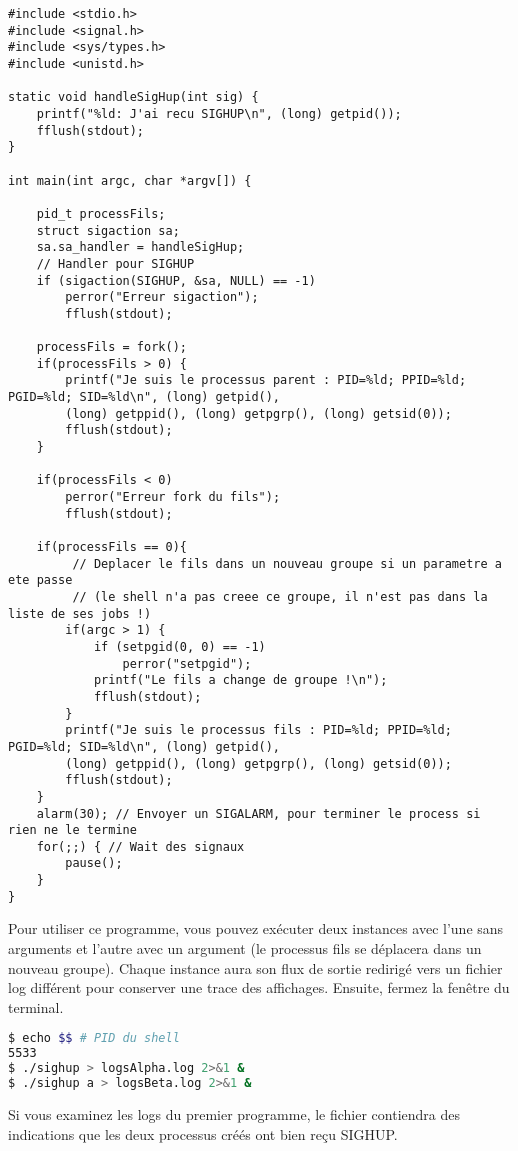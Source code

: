 \begin{lstlisting}[caption={sighup.c}, label={sighup.c}]
#include <stdio.h>
#include <signal.h>
#include <sys/types.h>
#include <unistd.h>

static void handleSigHup(int sig) {
    printf("%ld: J'ai recu SIGHUP\n", (long) getpid());
    fflush(stdout);
}

int main(int argc, char *argv[]) {

    pid_t processFils;
    struct sigaction sa;
    sa.sa_handler = handleSigHup;
    // Handler pour SIGHUP
    if (sigaction(SIGHUP, &sa, NULL) == -1)
        perror("Erreur sigaction");
        fflush(stdout);

    processFils = fork();
    if(processFils > 0) {
        printf("Je suis le processus parent : PID=%ld; PPID=%ld; PGID=%ld; SID=%ld\n", (long) getpid(),
        (long) getppid(), (long) getpgrp(), (long) getsid(0));
        fflush(stdout);
    }

    if(processFils < 0)
        perror("Erreur fork du fils");
        fflush(stdout);

    if(processFils == 0){  
         // Deplacer le fils dans un nouveau groupe si un parametre a ete passe
         // (le shell n'a pas creee ce groupe, il n'est pas dans la liste de ses jobs !)    
        if(argc > 1) {
            if (setpgid(0, 0) == -1)
                perror("setpgid");
            printf("Le fils a change de groupe !\n");
            fflush(stdout);
        }
        printf("Je suis le processus fils : PID=%ld; PPID=%ld; PGID=%ld; SID=%ld\n", (long) getpid(),
        (long) getppid(), (long) getpgrp(), (long) getsid(0));
        fflush(stdout);
    }
    alarm(30); // Envoyer un SIGALARM, pour terminer le process si rien ne le termine
    for(;;) { // Wait des signaux
        pause();
    }
}
\end{lstlisting}

Pour utiliser ce programme, vous pouvez exécuter deux instances avec l'une sans arguments et l'autre avec un argument (le processus fils se déplacera dans un nouveau groupe). 
Chaque instance aura son flux de sortie redirigé vers un fichier log différent pour conserver une trace des affichages. Ensuite, fermez la fenêtre du terminal.

\begin{lstlisting}[language=bash]
$ echo $$ # PID du shell
5533
$ ./sighup > logsAlpha.log 2>&1 &
$ ./sighup a > logsBeta.log 2>&1 &
\end{lstlisting}

Si vous examinez les logs  du premier programme, le fichier contiendra des indications que les deux processus créés ont bien reçu SIGHUP.

